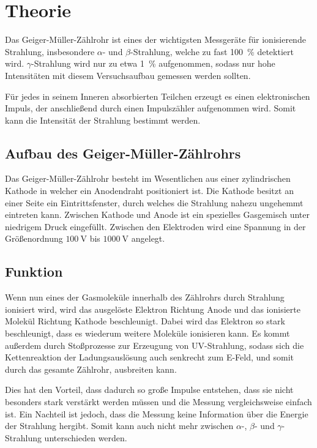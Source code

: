 \section{Theorie}
\label{sec:Theorie}
Das Geiger-Müller-Zählrohr ist eines der wichtigsten Messgeräte für ionisierende Strahlung,
insbesondere $\alpha$- und $\beta$-Strahlung, welche zu fast \SI{100}{\percent} detektiert wird.
$\gamma$-Strahlung wird nur zu etwa \SI{1}{\percent} aufgenommen,
sodass nur hohe Intensitäten mit diesem Versuchsaufbau gemessen werden sollten.

Für jedes in seinem Inneren absorbierten Teilchen erzeugt es einen elektronischen Impuls,
der anschließend durch einen Impulszähler aufgenommen wird.
Somit kann die Intensität der Strahlung bestimmt werden.

\subsection{Aufbau des Geiger-Müller-Zählrohrs}
Das Geiger-Müller-Zählrohr besteht im Wesentlichen aus einer zylindrischen Kathode in welcher ein Anodendraht positioniert ist.
Die Kathode besitzt an einer Seite ein Eintrittsfenster, durch welches die Strahlung nahezu ungehemmt eintreten kann.
Zwischen Kathode und Anode ist ein spezielles Gasgemisch unter niedrigem Druck eingefüllt.
Zwischen den Elektroden wird eine Spannung in der Größenordnung $\SI{100}{\volt}$ bis $\SI{1000}{\volt}$ angelegt.

\subsection{Funktion}
Wenn nun eines der Gasmoleküle innerhalb des Zählrohrs durch Strahlung ionisiert wird, wird das ausgelöste Elektron Richtung Anode und das ionisierte Molekül
Richtung Kathode beschleunigt. Dabei wird das Elektron so stark beschleunigt, dass es wiederum weitere Moleküle ionisieren kann.
Es kommt außerdem durch Stoßprozesse zur Erzeugung von UV-Strahlung, sodass sich die Kettenreaktion der Ladungsauslösung
auch senkrecht zum E-Feld, und somit durch das gesamte Zählrohr, ausbreiten kann.

Dies hat den Vorteil, dass dadurch so große Impulse entstehen, dass sie nicht besonders stark verstärkt werden müssen und die
Messung vergleichsweise einfach ist. Ein Nachteil ist jedoch, dass die Messung keine Information
über die Energie der Strahlung hergibt. Somit kann auch nicht mehr zwischen $\alpha$-, $\beta$- und $\gamma$-Strahlung unterschieden werden.

